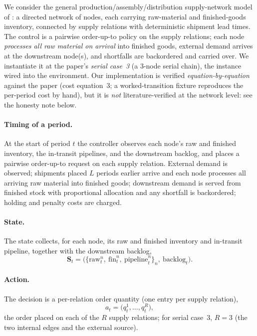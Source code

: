We consider the general production/assembly/distribution supply-network model of
\citet{pirhooshyaran2021network}: a directed network of nodes, each carrying raw-material and
finished-goods inventory, connected by supply relations with deterministic shipment lead times. The
control is a pairwise order-up-to policy on the supply relations; each node \emph{processes all raw
material on arrival} into finished goods, external demand arrives at the downstream node(s), and
shortfalls are backordered and carried over. We instantiate it at the paper's \emph{serial case~3}
(a 3-node serial chain), the instance wired into the environment. Our implementation is verified
\emph{equation-by-equation} against the paper (cost equation~3; a worked-transition fixture reproduces
the per-period cost by hand), but it is \emph{not} literature-verified at the network level: see the
honesty note below.

\paragraph{Timing of a period.}
At the start of period $t$ the controller observes each node's raw and finished inventory, the
in-transit pipelines, and the downstream backlog, and places a pairwise order-up-to request on each
supply relation. External demand is observed; shipments placed $L$ periods earlier arrive and each
node processes all arriving raw material into finished goods; downstream demand is served from finished
stock with proportional allocation and any shortfall is backordered; holding and penalty costs are
charged.

\paragraph{State.}
The state collects, for each node, its raw and finished inventory and in-transit pipeline, together
with the downstream backlog,
\begin{equation*}
    \mathbf{S}_t=\bigl(\{\text{raw}^{n}_t,\ \text{fin}^{n}_t,\ \text{pipeline}^{n}_t\}_{n},\ \text{backlog}_t\bigr).
\end{equation*}

\paragraph{Action.}
The decision is a per-relation order quantity (one entry per supply relation),
\begin{equation*}
    a_t=\bigl(q^{1}_t,\dots,q^{R}_t\bigr),
\end{equation*}
the order placed on each of the $R$ supply relations; for serial case~3, $R=3$ (the two internal edges
and the external source).

